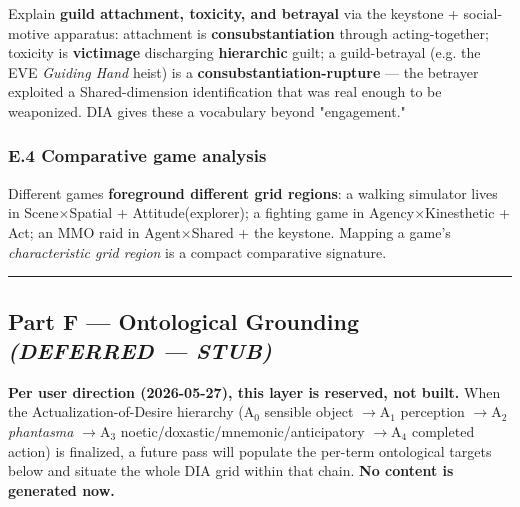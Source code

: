 \documentclass[11pt]{report}
\begin{document}
Explain \textbf{guild attachment, toxicity, and betrayal} via the keystone + social-motive apparatus: attachment is \textbf{consubstantiation} through acting-together; toxicity is \textbf{victimage} discharging \textbf{hierarchic} guilt; a guild-betrayal (e.g. the EVE \textit{Guiding Hand} heist) is a \textbf{consubstantiation-rupture} — the betrayer exploited a Shared-dimension identification that was real enough to be weaponized. DIA gives these a vocabulary beyond "engagement."


\subsubsection{E.4 Comparative game analysis}

Different games \textbf{foreground different grid regions}: a walking simulator lives in Scene$\times$\allowbreak Spatial + Attitude(explorer); a fighting game in Agency$\times$\allowbreak Kinesthetic + Act; an MMO raid in Agent$\times$\allowbreak Shared + the keystone. Mapping a game's \textit{characteristic grid region} is a compact comparative signature.


\vspace{0.4em}\hrule\vspace{0.8em}


\subsection{Part F — Ontological Grounding \textit{(DEFERRED — STUB)}}


\textbf{Per user direction (2026-05-27), this layer is reserved, not built.} When the Actualization-of-Desire hierarchy (A$_0$ sensible object $\rightarrow$\allowbreak  A$_1$ perception $\rightarrow$\allowbreak  A$_2$ \textit{phantasma} $\rightarrow$\allowbreak  A$_3$ noetic/doxastic/mnemonic/anticipatory $\rightarrow$\allowbreak  A$_4$ completed action) is finalized, a future pass will populate the per-term ontological targets below and situate the whole DIA grid within that chain. \textbf{No content is generated now.}
\end{document}
